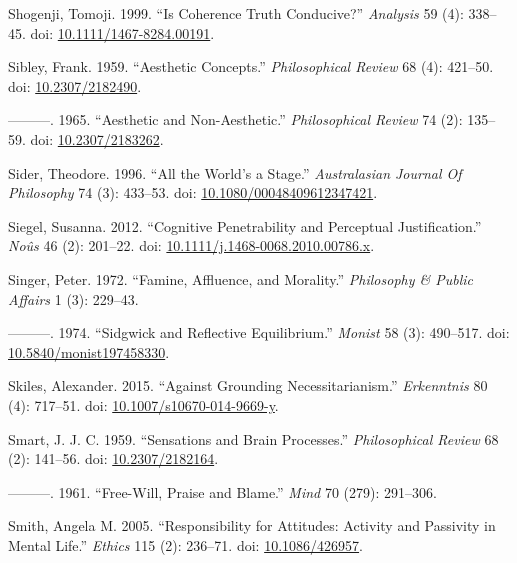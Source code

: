 \documentclass[
  10pt,
  letterpaper,
  DIV=11,
  numbers=noendperiod,
  twoside]{scrartcl}
\newlength{\cslhangindent}
\newenvironment{CSLReferences}[2] %
 {\begin{list}{}{%
  \setlength{\itemindent}{0pt}
  \setlength{\leftmargin}{0pt}
  \setlength{\parsep}{0pt}
  \ifodd #1
   \setlength{\leftmargin}{\cslhangindent}
   \setlength{\itemindent}{-1\cslhangindent}
  \fi
  \setlength{\itemsep}{#2\baselineskip}}}
 {\end{list}}
\begin{document}
\begin{CSLReferences}{1}{0}
Shogenji, Tomoji. 1999. {``Is Coherence Truth Conducive?''}
\emph{Analysis} 59 (4): 338--45. doi:
\href{https://doi.org/10.1111/1467-8284.00191}{10.1111/1467-8284.00191}.

Sibley, Frank. 1959. {``Aesthetic Concepts.''} \emph{Philosophical
Review} 68 (4): 421--50. doi:
\href{https://doi.org/10.2307/2182490}{10.2307/2182490}.

---------. 1965. {``Aesthetic and Non-Aesthetic.''} \emph{Philosophical
Review} 74 (2): 135--59. doi:
\href{https://doi.org/10.2307/2183262}{10.2307/2183262}.

Sider, Theodore. 1996. {``All the World's a Stage.''} \emph{Australasian
Journal Of Philosophy} 74 (3): 433--53. doi:
\href{https://doi.org/10.1080/00048409612347421}{10.1080/00048409612347421}.

Siegel, Susanna. 2012. {``Cognitive Penetrability and Perceptual
Justification.''} \emph{Noûs} 46 (2): 201--22. doi:
\href{https://doi.org/10.1111/j.1468-0068.2010.00786.x}{10.1111/j.1468-0068.2010.00786.x}.

Singer, Peter. 1972. {``Famine, Affluence, and Morality.''}
\emph{Philosophy \& Public Affairs} 1 (3): 229--43.

---------. 1974. {``Sidgwick and Reflective Equilibrium.''}
\emph{Monist} 58 (3): 490--517. doi:
\href{https://doi.org/10.5840/monist197458330}{10.5840/monist197458330}.

Skiles, Alexander. 2015. {``Against Grounding Necessitarianism.''}
\emph{Erkenntnis} 80 (4): 717--51. doi:
\href{https://doi.org/10.1007/s10670-014-9669-y}{10.1007/s10670-014-9669-y}.

Smart, J. J. C. 1959. {``Sensations and Brain Processes.''}
\emph{Philosophical Review} 68 (2): 141--56. doi:
\href{https://doi.org/10.2307/2182164}{10.2307/2182164}.

---------. 1961. {``Free-Will, Praise and Blame.''} \emph{Mind} 70
(279): 291--306.

Smith, Angela M. 2005. {``Responsibility for Attitudes: Activity and
Passivity in Mental Life.''} \emph{Ethics} 115 (2): 236--71. doi:
\href{https://doi.org/10.1086/426957}{10.1086/426957}.


\end{CSLReferences}
\end{document}
